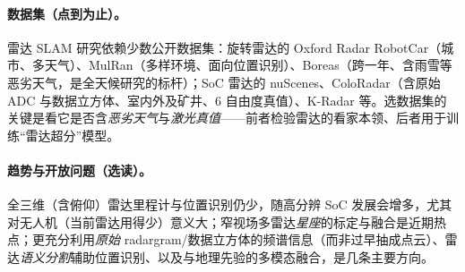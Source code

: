 \paragraph{数据集（点到为止）。}
雷达 SLAM 研究依赖少数公开数据集\cite{carlone2026handbook}：旋转雷达的 Oxford Radar RobotCar（城市、多天气）、MulRan（多样环境、面向位置识别）、Boreas（跨一年、含雨雪等恶劣天气，是全天候研究的标杆）；SoC 雷达的 nuScenes、ColoRadar（含原始 ADC 与数据立方体、室内外及矿井、$6$ 自由度真值）、K-Radar 等。选数据集的关键是看它是否含\emph{恶劣天气}与\emph{激光真值}——前者检验雷达的看家本领、后者用于训练“雷达超分”模型。

\paragraph{趋势与开放问题（选读）。}
全三维（含俯仰）雷达里程计与位置识别仍少，随高分辨 SoC 发展会增多，尤其对无人机（当前雷达用得少）意义大；窄视场多雷达\emph{星座}的标定与融合是近期热点；更充分利用\emph{原始} radargram/数据立方体的频谱信息（而非过早抽成点云）、雷达\emph{语义分割}辅助位置识别、以及与地理先验的多模态融合，是几条主要方向。

